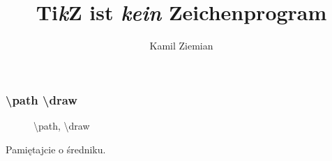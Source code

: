 \documentclass[10pt,t]{beamer}  %
\title{Ti\emph{k}Z ist \emph{kein} Zeichenprogram}
\author{Kamil Ziemian}
\date{}
\begin{document}



\maketitle



















\begin{frame}
  \frametitle{\textbackslash path \textbackslash draw}


  \begin{figure}

    \centering


    \caption{\textbackslash path, \textbackslash draw}

  \end{figure}

  Pamiętajcie o średniku.

\end{frame}
\end{document}
